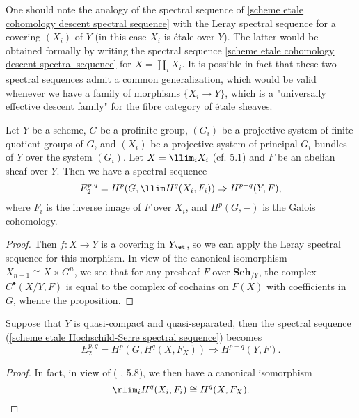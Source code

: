 \begin{remark}
One should note the analogy of the spectral sequence of \cref{scheme etale cohomology descent spectral sequence} with the Leray spectral sequence for a covering $(X_i)$ of $Y$ (in this case $X_i$ is \'etale over $Y$). The latter would be obtained formally by writing the spectral sequence \cref{scheme etale cohomology descent spectral sequence} for $X=\coprod_iX_i$. It is possible in fact that these two spectral sequences admit a common generalization, which would be valid whenever we have a family of morphisms $\{X_i\to Y\}$, which is a "universally effective descent family" for the fibre category of \'etale sheaves. 
\end{remark}

\begin{proposition}\label{scheme etale Hochschild-Serre spectral sequence}
Let $Y$ be a scheme, $G$ be a profinite group, $(G_i)$ be a projective system of finite quotient groups of $G$, and $(X_i)$ be a projective system of principal $G_i$-bundles of $Y$ over the system $(G_i)$. Let $X=\llim_iX_i$ (cf. \cite{SGA4-2}  5.1) and $F$ be an abelian sheaf over $Y$. Then we have a spectral sequence
\[E_2^{p,q}=H^p(G,\llim H^q(X_i,F_i))\Rightarrow H^{p+q}(Y,F),\]
where $F_i$ is the inverse image of $F$ over $X_i$, and $H^p(G,-)$ is the Galois cohomology.
\end{proposition}
\begin{proof}
Then $f:X\to Y$ is a covering in $Y_\et$, so we can apply the Leray spectral sequence for this morphism. In view of the canonical isomorphism $X_{n+1}\cong X\times G^n$, we see that for any presheaf $F$ over $\mathbf{Sch}_{/Y}$, the complex $C^\bullet(X/Y,F)$ is equal to the complex of cochains on $F(X)$ with coefficients in $G$, whence the proposition. 
\end{proof}

\begin{corollary}\label{scheme qcqs etale Hochschild-Serre spectral sequence}
Suppose that $Y$ is quasi-compact and quasi-separated, then the spectral sequence (\ref{scheme etale Hochschild-Serre spectral sequence}) becomes
\[E_2^{p,q}=H^p(G,H^q(X,F_X))\Rightarrow H^{p+q}(Y,F).\]
\end{corollary}
\begin{proof}
In fact, in view of (\cite{SGA4-2} , 5.8), we then have a canonical isomorphism
\begin{equation*}
\rlim_iH^q(X_i,F_i)\cong H^q(X,F_X).\qedhere
\end{equation*}
\end{proof}

